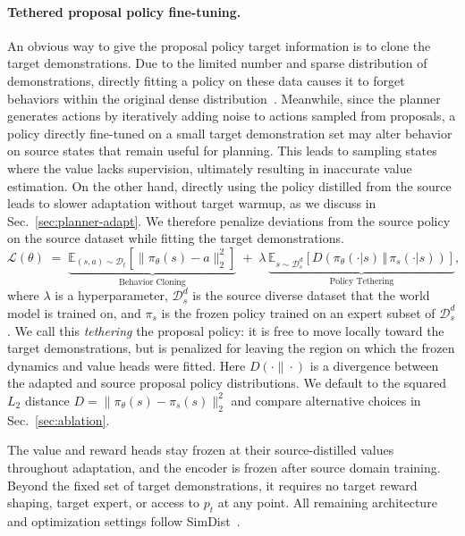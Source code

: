 \documentclass{article} %
\begin{document}
\paragraph{Tethered proposal policy fine-tuning.}
An obvious way to give the proposal policy target information is to clone the target demonstrations. Due to the limited number and sparse distribution of demonstrations, directly fitting a policy on these data causes it to forget behaviors within the original dense distribution~\citep{jain2026smooth}. Meanwhile, since the planner generates actions by iteratively adding noise to actions sampled from proposals, a policy directly fine-tuned on a small target demonstration set may alter behavior on source states that remain useful for planning. This leads to sampling states where the value lacks supervision, ultimately resulting in inaccurate value estimation. On the other hand, directly using the policy distilled from the source leads to slower adaptation without target warmup, as we discuss in Sec.~\ref{sec:planner-adapt}. We therefore penalize deviations from the source policy on the source dataset while fitting the target demonstrations.
\begin{equation}
\mathcal{L}(\theta) \;=\;
\underbrace{\mathbb{E}_{(s,a)\sim\mathcal{D}_t}\!\left[\lVert\pi_\theta(s)-a\rVert_2^2\right]}
           _{\text{Behavior Cloning}}
\;+\; \lambda \,
\underbrace{\mathbb{E}_{s\sim\mathcal{D}^d_s}\!\left[
  D\!\left(\pi_\theta(\cdot|s)\,\Vert\,\pi_s(\cdot|s)\right)\right]}
           _{\text{Policy Tethering}},
\label{eq:tether}
\end{equation}
where $\lambda$ is a hyperparameter, $\mathcal{D}^d_s$ is the source diverse dataset that the world model is trained on, and $\pi_s$ is the frozen policy trained on an expert subset of $\mathcal{D}^d_s$. We call this \emph{tethering} the proposal policy: it is free to move locally toward the target demonstrations, but is penalized for leaving the region on which the frozen dynamics and value heads were fitted. Here $D(\cdot\|\cdot)$ is a divergence between the adapted and source proposal policy distributions. We default to the squared $L_2$ distance $D = \lVert\pi_\theta(s) - \pi_s(s)\rVert_2^2$ and compare alternative choices in Sec.~\ref{sec:ablation}.

The value and reward heads stay frozen at their source-distilled values throughout adaptation, and the encoder is frozen after source domain training. Beyond the fixed set of target demonstrations, it requires no target reward shaping, target expert, or access to $p_t$ at any point. All remaining architecture and optimization settings follow SimDist~\citep{levy2026simulation}.
\end{document}
